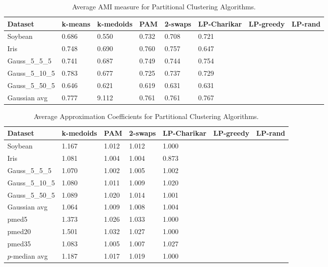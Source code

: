 \documentclass[conference, 10pt, final]{IEEEtran}
\begin{document}
\begin{table}[!t]
\caption{Average AMI measure for Partitional Clustering Algorithms.}
\centering
\begin{tabular}{ | l | l | l | l | l | l | l | l| }
\hline
Dataset	&	k-means	&	k-medoids	&	PAM	&	2-swaps	&	LP-Charikar	&	LP-greedy	&	LP-rand	\\ \hline
Soybean	&	0.686	&	0.550	&	0.732	&	0.708	&	0.721	&		&		\\
Iris	&	0.748	&	0.690	&	0.760	&	0.757	&	0.647	&		&		\\
Gauss\_5\_5\_5	&	0.741	&	0.687	&	0.749	&	0.744	&	0.754	&		&		\\
Gauss\_5\_10\_5	&	0.783	&	0.677	&	0.725	&	0.737	&	0.729	&		&		\\
Gauss\_5\_50\_5	&	0.646	&	0.621	&	0.619	&	0.631	&	0.631	&		&		\\
Gaussian avg	&	0.777	&	9.112	&	0.761	&	0.761	&	0.767	&		&		\\ \hline
\end{tabular}
\label{fig:flat_results_AMI}
\end{table}


\begin{table}[!t]
\caption{Average Approximation Coefficients for Partitional Clustering Algorithms.}
\centering
\begin{tabular}{ | l | l | l | l | l | l| l|}
\hline
Dataset	&	k-medoids	&	PAM	&	2-swaps	&	LP-Charikar	&	LP-greedy	&	LP-rand	\\ \hline
Soybean	&	1.167	&	1.012	&	1.012	&	1.000	&		&		\\
Iris	&	1.081	&	1.004	&	1.004	&	0.873	&		&		\\
Gauss\_5\_5\_5	&	1.070	&	1.002	&	1.005	&	1.002	&		&		\\
Gauss\_5\_10\_5	&	1.080	&	1.011	&	1.009	&	1.020	&		&		\\
Gauss\_5\_50\_5	&	1.089	&	1.020	&	1.014	&	1.001	&		&		\\
Gaussian avg	&	1.064	&	1.009	&	1.008	&	1.004	&		&		\\
pmed5	&	1.373	&	1.026	&	1.033	&	1.000	&		&		\\
pmed20	&	1.501	&	1.032	&	1.027	&	1.000	&		&		\\
pmed35	&	1.083	&	1.005	&	1.007	&	1.027	&		&		\\
$p$-median avg	&	1.187	&	1.017	&	1.019	&	1.000	&		&		\\ \hline
\end{tabular}
\label{fig:flat_results_approx}
\end{table}
\end{document}
